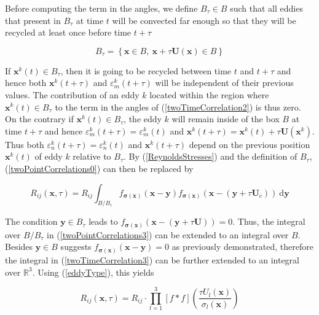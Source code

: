 \noindent Before computing the term in the angles, we define $B_{\tau} \in B$  such that all eddies that present in $B_{\tau}$ at time $t$ will be convected far enough so that they will be recycled at least once before time $t+\tau$

\begin{equation}
B_{\tau} = \left\{\boldsymbol{x}\in B, \ \boldsymbol{x}+\tau \boldsymbol{U}(\boldsymbol{x}) \in B \right\}
\end{equation}

\noindent If $\boldsymbol{x}^k(t)\in B_{\tau}$, then it is going to be recycled between time $t$ and $t+\tau$ and hence both $\boldsymbol{x}^k(t+\tau)$ and $\varepsilon_m^k(t+\tau)$ will be independent of their previous values. The contribution of an eddy $k$ located within the region where $\boldsymbol{x}^k(t) \in B_{\tau}$ to the term in the angles of (\ref{twoTimeCorrelation2}) is thus zero. On the contrary if $\boldsymbol{x}^k(t) \in B_{\tau}$, the eddy $k$ will remain inside of the box $B$ at time $t + \tau$ and hence $\varepsilon_m^k(t+\tau) =  \varepsilon_m^k(t)$ and $\boldsymbol{x}^k(t+\tau) =\boldsymbol{x}^k(t)+\tau\boldsymbol{U}(\boldsymbol{x}^k)$. Thus both $\varepsilon_n^k(t+\tau) =  \varepsilon_n^k(t)$ and $\boldsymbol{x}^k(t+\tau)$ depend on the previous position $\boldsymbol{x}^k(t)$ of eddy $k$ relative to $B_{\tau}$. By (\ref{ReynoldsStresses}) and the definition of $B_{\tau}$, (\ref{twoPointCorrelations0}) can then be replaced by

\begin{equation} \label{twoTimeCorrelation3}
R_{ij}(\boldsymbol{x},\tau) = R_{ij} \int_{B/B_{\tau}}f_{\boldsymbol{\sigma}(\boldsymbol{x})}(\boldsymbol{x}-\boldsymbol{y}) f_{\boldsymbol{\sigma}(\boldsymbol{x})}(\boldsymbol{x}-(\boldsymbol{y}+\tau\boldsymbol{U}_c)) \ \mathrm{d}\boldsymbol{y}
\end{equation}

\noindent The condition $\boldsymbol{y}\in B_{\tau}$ leads to $f_{\boldsymbol{\sigma}(\boldsymbol{x})}(\boldsymbol{x}-(\boldsymbol{y}+\tau\boldsymbol{U}))=0$. Thus, the integral over $B/B_{\tau}$ in (\ref{twoPointCorrelations3}) can be extended to an integral over $B$. Besides $\boldsymbol{y}\in B$ suggests $f_{\boldsymbol{\sigma}(\boldsymbol{x})}(\boldsymbol{x}-\boldsymbol{y})=0$ as previously demonstrated, therefore the integral in (\ref{twoTimeCorrelation3}) can be further extended to an integral over $\mathbb{R}^3$. Using (\ref{eddyType}), this yields

\begin{equation} \label{twoTimeCorrelation4}
R_{ij}(\boldsymbol{x},\tau) = R_{ij} \cdot \prod_{l=1}^3[f*f]\left(\frac{\tau U_{l}(\boldsymbol{x})}{\sigma_l(\boldsymbol{x})}\right)
\end{equation}

